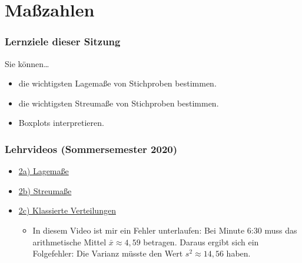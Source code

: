 \documentclass[
  11pt,
  ngerman,
  a4paper,
]{report}
\providecommand{\tightlist}{%
  \setlength{\itemsep}{0pt}\setlength{\parskip}{0pt}}
\begin{document}
\hypertarget{mauxdfzahlen}{%
\chapter{Maßzahlen}\label{mauxdfzahlen}}

\hypertarget{lernziele-dieser-sitzung-1}{%
\subsection*{Lernziele dieser Sitzung}\label{lernziele-dieser-sitzung-1}}

Sie können\ldots{}

\begin{itemize}
\tightlist
\item
  die wichtigsten Lagemaße von Stichproben bestimmen.
\item
  die wichtigsten Streumaße von Stichproben bestimmen.
\item
  Boxplots interpretieren.
\end{itemize}

\hypertarget{lehrvideos-sommersemester-2020-1}{%
\subsection*{Lehrvideos (Sommersemester 2020)}\label{lehrvideos-sommersemester-2020-1}}

\begin{itemize}
\tightlist
\item
  \href{https://video01.uni-frankfurt.de/Mediasite/Play/bbb30f8025cf48e99a48700b0600e1e11d}{2a) Lagemaße}
\item
  \href{https://video01.uni-frankfurt.de/Mediasite/Play/cfdb254c058f44228e7b026f36986cc31d}{2b) Streumaße}
\item
  \href{https://video01.uni-frankfurt.de/Mediasite/Play/d115769da4ee4e25a9062a9b2e2e11c41d}{2c) Klassierte Verteilungen}

  \begin{itemize}
  \tightlist
  \item
    In diesem Video ist mir ein Fehler unterlaufen: Bei Minute 6:30 muss das arithmetische Mittel \(\bar{x}\approx4{,}59\) betragen. Daraus ergibt sich ein Folgefehler: Die Varianz müsste den Wert \(s^2\approx14{,}56\) haben.
  \end{itemize}
\end{itemize}
\end{document}
